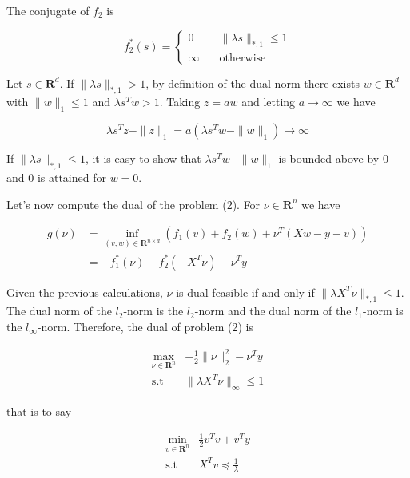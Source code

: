 \documentclass[a4paper, 11pt]{article}
\begin{document}
The conjugate of $f_2$ is

$$
f_2^*(s) = \left\{
        \begin{array}{ll}
           0 & \quad \|\lambda s \|_{*,1} \leq 1 \\
           \infty  & \quad \text{otherwise}
        \end{array}
    \right.
$$

Let $s \in \mathbf{R}^d$. If $\|\lambda s \|_{*,1} > 1$, by definition of the dual norm there exists $w \in
\mathbf{R}^d$ with $\|w\|_1 \leq 1$ and $\lambda s^Tw > 1$. Taking $z = aw$ and letting $a\to\infty$ we have 

\begin{equation*}
  \lambda s^Tz - \|z\|_1  = a(\lambda s^Tw - \|w\|_1) \to \infty
\end{equation*}

If $\|\lambda s \|_{*,1} \leq 1$, it is easy to show that $\lambda s^Tw - \|w\|_1$ is bounded above by 0 and 0 is
attained for $w=0$. \\

\clearpage

Let's now compute the dual of the problem (2). For $\nu \in \mathbf{R}^n$ we have 

\begin{align*}
  g(\nu) &= \inf_{(v,w) \in \mathbf{R}^{n\times d}} \left( f_1(v) + f_2(w) + \nu^T(Xw - y - v) \right) \\
 & = - f_1^*(\nu) - f_2^*(-X^T\nu) - \nu^Ty
\end{align*}


Given the previous calculations, $\nu$ is dual feasible if and only if $\|\lambda X^T \nu \|_{*,1} \leq 1$. The dual 
norm of the $l_2$-norm is the $l_2$-norm and the dual norm of the $l_1$-norm is the $l_{\infty}$-norm. Therefore, the
dual of problem (2) is

\begin{align}
  \max_{\nu \in \mathbf{R}^{n}} & -\frac{1}{2} \| \nu \|_2^2 - \nu^Ty \\
  \text{s.t} \quad &  \|\lambda X^T \nu \|_{\infty} \leq 1 \nonumber
\end{align}

that is to say 

\begin{align}
  \min_{v \in \mathbf{R}^{n}} &  \frac{1}{2}v^Tv + v^Ty \\
  \text{s.t} \quad & X^T v \preceq \frac{1}{\lambda} \nonumber
\end{align}
\end{document}
